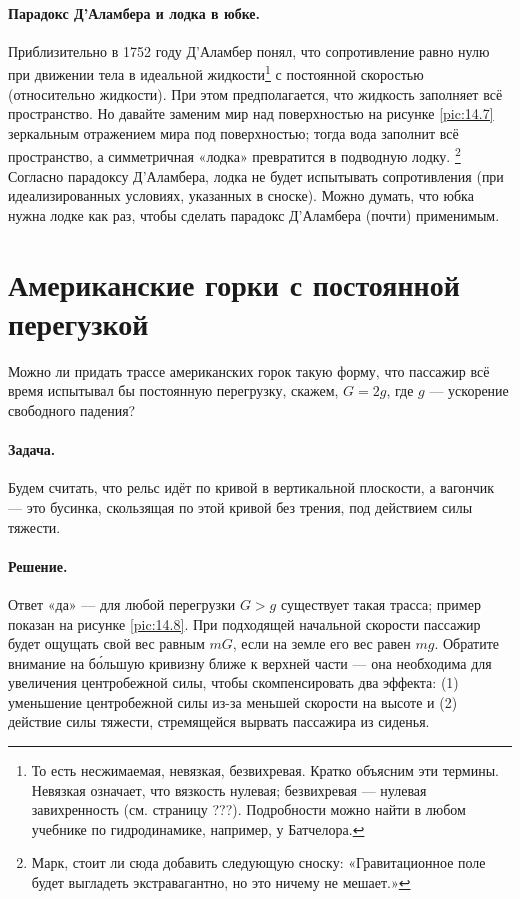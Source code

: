 \paragraph{Парадокс Д’Аламбера и лодка в юбке.}
Приблизительно в 1752 году Д’Аламбер понял,
что сопротивление равно нулю при движении тела в идеальной жидкости\footnote{То есть несжимаемая, невязкая, безвихревая.
Кратко объясним эти термины.
Невязкая означает, что вязкость нулевая;
безвихревая --- нулевая завихренность (см. страницу ???).
Подробности можно найти в любом учебнике по гидродинамике, например, у Батчелора.}%
с постоянной скоростью (относительно жидкости).
При этом предполагается, что жидкость заполняет всё пространство.
Но давайте заменим мир над поверхностью на рисунке \ref{pic:14.7} зеркальным отражением мира под поверхностью; тогда вода заполнит всё пространство, а симметричная «лодка» превратится в подводную лодку.%
\footnote{Марк, стоит ли сюда добавить следующую сноску: «Гравитационное поле будет выгладеть экстравагантно, но это ничему не мешает.»}
Согласно парадоксу Д’Аламбера, лодка не будет испытывать сопротивления (при идеализированных условиях, указанных в сноске).
Можно думать, что юбка нужна лодке как раз, чтобы сделать парадокс Д’Аламбера (почти) применимым.

\section{Американские горки с постоянной перегузкой}

Можно ли придать трассе американских горок такую форму, что пассажир всё время испытывал бы постоянную перегрузку, скажем, $G=2g$, где $g$ — ускорение свободного падения?

\paragraph{Задача.}
Будем считать, что рельс идёт по кривой в вертикальной плоскости, а вагончик — это бусинка, скользящая по этой кривой без трения, под действием силы тяжести.

\paragraph{Решение.}
Ответ «да» ---
для любой перегрузки $G>g$ существует такая трасса; пример показан на рисунке \ref{pic:14.8}.
При подходящей начальной скорости пассажир будет ощущать свой вес равным $mG$, если на земле его вес равен $mg$.
Обратите внимание на б\'{о}льшую кривизну ближе к верхней части — она необходима для увеличения центробежной силы, чтобы скомпенсировать два эффекта: (1) уменьшение центробежной силы из-за меньшей скорости на высоте и (2) действие силы тяжести, стремящейся вырвать пассажира из сиденья.

